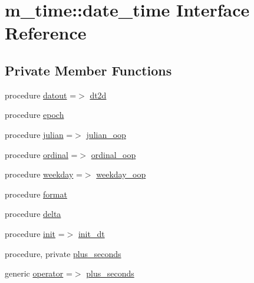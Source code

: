 \hypertarget{structm__time_1_1date__time}{}\section{m\+\_\+time\+:\+:date\+\_\+time Interface Reference}
\label{structm__time_1_1date__time}
\subsection*{Private Member Functions}
\begin{DoxyCompactItemize}
\item 
procedure \mbox{\hyperlink{structm__time_1_1date__time_a69ded91df8430fd8bacc28c8206dbba1}{datout}} =$>$ \mbox{\hyperlink{namespacem__time_aa281690d7f68f14842b00d238702e774}{dt2d}}
\item 
procedure \mbox{\hyperlink{structm__time_1_1date__time_a82e907454834f91e7aa081755367f81b}{epoch}}
\item 
procedure \mbox{\hyperlink{structm__time_1_1date__time_a213c4d0b61c448585796955c2e336dcc}{julian}} =$>$ \mbox{\hyperlink{namespacem__time_aff0a1b524b578e85efe20b87fbe9db61}{julian\+\_\+oop}}
\item 
procedure \mbox{\hyperlink{structm__time_1_1date__time_a0020bfaff4b78b7b0688dada7997d9f6}{ordinal}} =$>$ \mbox{\hyperlink{namespacem__time_a7fb507bb72a1872ec2a86fb7f3a50d75}{ordinal\+\_\+oop}}
\item 
procedure \mbox{\hyperlink{structm__time_1_1date__time_abfb29551ce7b06e12ae947bac78cd345}{weekday}} =$>$ \mbox{\hyperlink{namespacem__time_ac43e082c8ffd7687c4fc91beddc15720}{weekday\+\_\+oop}}
\item 
procedure \mbox{\hyperlink{structm__time_1_1date__time_acb5b22e87e6cf552a3d309bb0ead2275}{format}}
\item 
procedure \mbox{\hyperlink{structm__time_1_1date__time_aed911f77f6ec0b0572a0ea5ab03351df}{delta}}
\item 
procedure \mbox{\hyperlink{structm__time_1_1date__time_aac1087f981460b9eae1aa73e17c9943c}{init}} =$>$ \mbox{\hyperlink{namespacem__time_a72455f763954fae8ebc0f454033d82a8}{init\+\_\+dt}}
\item 
procedure, private \mbox{\hyperlink{structm__time_1_1date__time_a05e1950f16d81be0499b403b7e369b40}{plus\+\_\+seconds}}
\item 
generic \mbox{\hyperlink{structm__time_1_1date__time_ad51508db1d161547062f40dcd91f4e4b}{operator}} =$>$ \mbox{\hyperlink{structm__time_1_1date__time_a05e1950f16d81be0499b403b7e369b40}{plus\+\_\+seconds}}

\end{DoxyCompactItemize}
